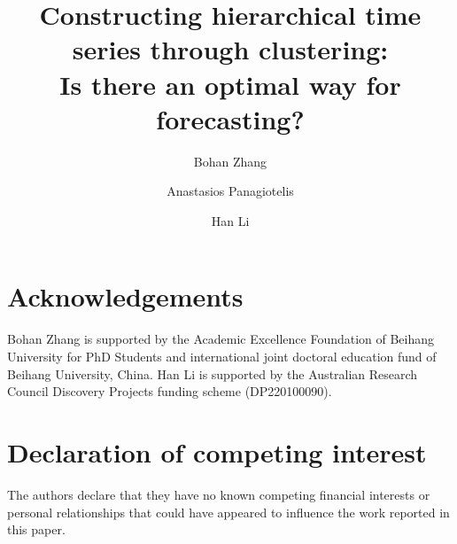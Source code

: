 \documentclass[a4paper,review,12pt,authoryear]{elsarticle}
\begin{document}
\begin{frontmatter}

\title{Constructing hierarchical time series through clustering: \\Is there an optimal way for forecasting?}



\author[label1]{Bohan Zhang}
\address[label1]{School of Economics and Management, Beihang University, Beijing, China}

\author[label2]{Anastasios Panagiotelis}
\address[label2]{The University of Sydney Business School, NSW 2006, Australia}
\author[label3]{Han Li}
\address[label3]{Department of Economics, The University of Melbourne, VIC 3010, Australia}


\end{frontmatter}

\section*{Acknowledgements}

Bohan Zhang is supported by the Academic Excellence Foundation of Beihang University for PhD Students and international joint doctoral education fund of Beihang University, China. Han Li is supported by the Australian Research Council Discovery Projects funding scheme (DP220100090).

\section*{Declaration of competing interest}

The authors declare that they have no known competing financial interests or personal relationships that could have appeared to influence the work reported in this paper. 
\end{document}
